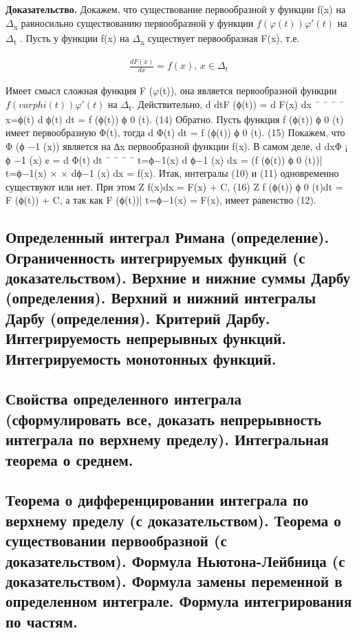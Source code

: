 \documentclass[11pt]{article}
\begin{document}
\textbf{Доказательство.} Докажем, что существование первообразной у функции f(x) на
\(\Delta\)\textsubscript{x} равносильно существованию первообразной у функции \(f(\varphi(t))\varphi'(t)\)  на \(\Delta\)\textsubscript{t}
. Пусть у функции f(x) на \(\Delta\)\textsubscript{x} существует первообразная F(x), т.е.

\begin{eqnarray}
\frac{dF(x)}{dx} = f(x)\text{, } x\in\Delta_t
\end{eqnarray}

Имеет смысл сложная функция F (\(\varphi\)(t)), она является первообразной функции \(f(varphi(t))\varphi'(t)\) на \(\Delta\)\textsubscript{t}. 
Действительно,
d
dtF (ϕ(t)) = d F(x)
dx
¯
¯
¯
¯
x=ϕ(t)
d ϕ(t)
dt = f (ϕ(t)) ϕ
0
(t). (14)
Обратно. Пусть функция f (ϕ(t)) ϕ
0
(t) имеет первообразную Φ(t), тогда
d Φ(t)
dt = f (ϕ(t)) ϕ
0
(t). (15)
Покажем, что Φ (ϕ
−1
(x)) является на ∆x первообразной функции f(x). В самом
деле,
d
dxΦ
¡
ϕ
−1
(x)
¢
=
d Φ(t)
dt
¯
¯
¯
¯
t=ϕ−1(x)
d ϕ−1
(x)
dx = (f (ϕ(t)) ϕ
0
(t))|
t=ϕ−1(x) ×
×
dϕ−1
(x)
dx = f(x).
Итак, интегралы (10) и (11) одновременно существуют или нет. При этом
Z
f(x)dx = F(x) + C, (16)
Z
f (ϕ(t)) ϕ
0
(t)dt = F (ϕ(t)) + C,
а так как F (ϕ(t))|
t=ϕ−1(x) = F(x), имеет равенство (12).
\subsection{Определенный интеграл Римана (определение). Ограниченность интегрируемых функций (с доказательством). Верхние и нижние суммы Дарбу (определения). Верхний и нижний интегралы Дарбу (определения). Критерий Дарбу. Интегрируемость непрерывных функций. Интегрируемость монотонных функций.}
\label{sec:org8989432}

\subsection{Свойства определенного интеграла (сформулировать все, доказать непрерывность интеграла по верхнему пределу). Интегральная теорема о среднем.}
\label{sec:org5b82c7b}

\subsection{Теорема о дифференцировании интеграла по верхнему пределу (с доказательством).  Теорема о существовании первообразной (с доказательством). Формула Ньютона-Лейбница (с доказательством). Формула замены переменной в определенном интеграле. Формула интегрирования по частям.}
\label{sec:orgb67e220}
\end{document}
